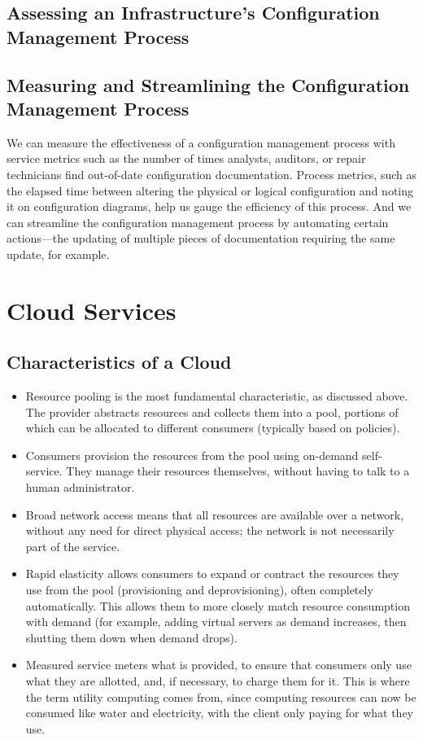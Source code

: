 \documentclass[a4]{article}
\begin{document}
\begin{multicols}{3}
\subsection{Assessing an Infrastructure’s Configuration Management Process}
\subsection{Measuring and Streamlining the Configuration Management Process}
We can measure the effectiveness of a configuration management process with service metrics such as the number of times
analysts, auditors, or repair technicians find out-of-date configuration documentation. 
Process metrics, such as the elapsed time between altering the physical or logical configuration and noting it on 
configuration diagrams, help us gauge the efficiency of this process. 
And we can streamline the configuration management process by automating certain actions—the updating of multiple 
pieces of documentation requiring the same update, for example.

\section{Cloud Services}
\subsection{Characteristics of a Cloud}
\begin{itemize}
\item Resource pooling is the most fundamental characteristic, as discussed above. The
provider abstracts resources and collects them into a pool, portions of which can be
allocated to different consumers (typically based on policies).
\item Consumers provision the resources from the pool using on-demand self-service.
They manage their resources themselves, without having to talk to a human
administrator.
\item Broad network access means that all resources are available over a network,
without any need for direct physical access; the network is not necessarily part of
the service.
\item Rapid elasticity allows consumers to expand or contract the resources they use
from the pool (provisioning and deprovisioning), often completely automatically. This
allows them to more closely match resource consumption with demand (for
example, adding virtual servers as demand increases, then shutting them down
when demand drops).
\item Measured service meters what is provided, to ensure that consumers only use what
they are allotted, and, if necessary, to charge them for it. This is where the term
utility computing comes from, since computing resources can now be consumed like
water and electricity, with the client only paying for what they use.
\end{itemize}


\end{multicols}
\end{document}

